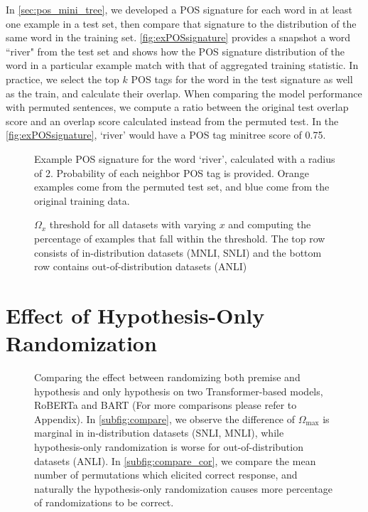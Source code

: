 \documentclass[11pt,a4paper]{article}
\begin{document}
In \autoref{sec:pos_mini_tree}, we developed a POS signature for each word in at least one example in a test set, then compare that signature to the distribution of the same word in the training set. \autoref{fig:exPOSsignature} provides a snapshot a word ``river" from the test set and shows how the POS signature distribution of the word in a particular example match with that of aggregated training statistic. In practice, we select the top $k$ POS tags for the word in the test signature as well as the train, and calculate their overlap. When comparing the model performance with permuted sentences, we compute a ratio between the original test overlap score and an overlap score calculated instead from the permuted test. In the \autoref{fig:exPOSsignature}, `river' would have a POS tag minitree score of 0.75.

\begin{figure}[ht]
    \centering
    \caption{Example POS signature for the word `river', calculated with a radius of 2. Probability of each neighbor POS tag is provided. Orange examples come from the permuted test set, and blue come from the original training data. }
    \label{fig:exPOSsignature}
\end{figure}

\begin{figure*}
    \centering
    \caption{$\Omega_x$ threshold for all datasets with varying $x$ and computing the percentage of examples that fall within the threshold. The top row consists of in-distribution datasets (MNLI, SNLI) and the bottom row contains out-of-distribution datasets (ANLI)}
    \label{fig:threshold_omega_x}
\end{figure*}

\section{Effect of Hypothesis-Only Randomization}
\label{app_sec:HO}

\begin{figure*}[ht]
    \centering
    \caption{Comparing the effect between randomizing both premise and hypothesis and only hypothesis on two Transformer-based models, RoBERTa and BART (For more comparisons please refer to Appendix). In \ref{subfig:compare}, we observe the difference of $\Omega_{\text{max}}$ is marginal in in-distribution datasets (SNLI, MNLI), while hypothesis-only randomization is worse for out-of-distribution datasets (ANLI). In \ref{subfig:compare_cor}, we compare the mean number of permutations which elicited correct response, and naturally the hypothesis-only randomization causes more percentage of randomizations to be correct.}
    \label{fig:hypothesis_compare}
\end{figure*}
\end{document}
